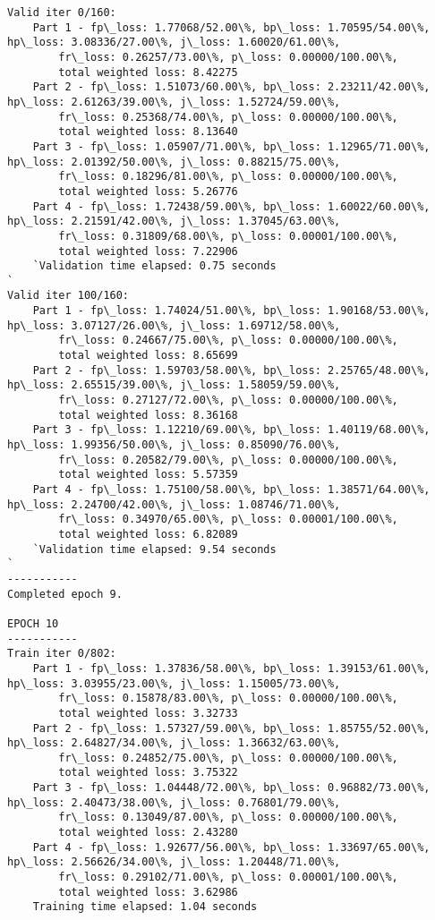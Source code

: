 \documentclass[11pt]{article}
\begin{document}
\begin{Verbatim}[commandchars=\\\{\}]
Valid iter 0/160:
	Part 1 - fp\_loss: 1.77068/52.00\%, bp\_loss: 1.70595/54.00\%, hp\_loss: 3.08336/27.00\%, j\_loss: 1.60020/61.00\%, 
		fr\_loss: 0.26257/73.00\%, p\_loss: 0.00000/100.00\%, 
		total weighted loss: 8.42275
	Part 2 - fp\_loss: 1.51073/60.00\%, bp\_loss: 2.23211/42.00\%, hp\_loss: 2.61263/39.00\%, j\_loss: 1.52724/59.00\%, 
		fr\_loss: 0.25368/74.00\%, p\_loss: 0.00000/100.00\%, 
		total weighted loss: 8.13640
	Part 3 - fp\_loss: 1.05907/71.00\%, bp\_loss: 1.12965/71.00\%, hp\_loss: 2.01392/50.00\%, j\_loss: 0.88215/75.00\%, 
		fr\_loss: 0.18296/81.00\%, p\_loss: 0.00000/100.00\%, 
		total weighted loss: 5.26776
	Part 4 - fp\_loss: 1.72438/59.00\%, bp\_loss: 1.60022/60.00\%, hp\_loss: 2.21591/42.00\%, j\_loss: 1.37045/63.00\%, 
		fr\_loss: 0.31809/68.00\%, p\_loss: 0.00001/100.00\%, 
		total weighted loss: 7.22906
	`Validation time elapsed: 0.75 seconds
`
Valid iter 100/160:
	Part 1 - fp\_loss: 1.74024/51.00\%, bp\_loss: 1.90168/53.00\%, hp\_loss: 3.07127/26.00\%, j\_loss: 1.69712/58.00\%, 
		fr\_loss: 0.24667/75.00\%, p\_loss: 0.00000/100.00\%, 
		total weighted loss: 8.65699
	Part 2 - fp\_loss: 1.59703/58.00\%, bp\_loss: 2.25765/48.00\%, hp\_loss: 2.65515/39.00\%, j\_loss: 1.58059/59.00\%, 
		fr\_loss: 0.27127/72.00\%, p\_loss: 0.00000/100.00\%, 
		total weighted loss: 8.36168
	Part 3 - fp\_loss: 1.12210/69.00\%, bp\_loss: 1.40119/68.00\%, hp\_loss: 1.99356/50.00\%, j\_loss: 0.85090/76.00\%, 
		fr\_loss: 0.20582/79.00\%, p\_loss: 0.00000/100.00\%, 
		total weighted loss: 5.57359
	Part 4 - fp\_loss: 1.75100/58.00\%, bp\_loss: 1.38571/64.00\%, hp\_loss: 2.24700/42.00\%, j\_loss: 1.08746/71.00\%, 
		fr\_loss: 0.34970/65.00\%, p\_loss: 0.00001/100.00\%, 
		total weighted loss: 6.82089
	`Validation time elapsed: 9.54 seconds
`
-----------
Completed epoch 9.

EPOCH 10
-----------
Train iter 0/802:
	Part 1 - fp\_loss: 1.37836/58.00\%, bp\_loss: 1.39153/61.00\%, hp\_loss: 3.03955/23.00\%, j\_loss: 1.15005/73.00\%, 
		fr\_loss: 0.15878/83.00\%, p\_loss: 0.00000/100.00\%, 
		total weighted loss: 3.32733
	Part 2 - fp\_loss: 1.57327/59.00\%, bp\_loss: 1.85755/52.00\%, hp\_loss: 2.64827/34.00\%, j\_loss: 1.36632/63.00\%, 
		fr\_loss: 0.24852/75.00\%, p\_loss: 0.00000/100.00\%, 
		total weighted loss: 3.75322
	Part 3 - fp\_loss: 1.04448/72.00\%, bp\_loss: 0.96882/73.00\%, hp\_loss: 2.40473/38.00\%, j\_loss: 0.76801/79.00\%, 
		fr\_loss: 0.13049/87.00\%, p\_loss: 0.00000/100.00\%, 
		total weighted loss: 2.43280
	Part 4 - fp\_loss: 1.92677/56.00\%, bp\_loss: 1.33697/65.00\%, hp\_loss: 2.56626/34.00\%, j\_loss: 1.20448/71.00\%, 
		fr\_loss: 0.29102/71.00\%, p\_loss: 0.00001/100.00\%, 
		total weighted loss: 3.62986
	Training time elapsed: 1.04 seconds


\end{Verbatim}
\end{document}
